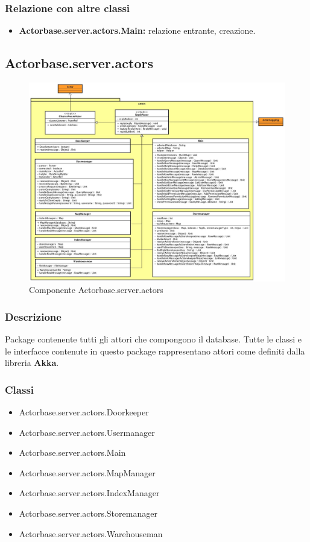 \documentclass[a4paper]{article}
\begin{document}
			\subsubsection{Relazione con altre classi}
				\begin{itemize}
					\item \textbf{Actorbase.server.actors.Main:} relazione entrante, creazione. 
				\end{itemize}

				
		\subsection{Actorbase.server.actors}
		
			\begin{figure} [H]
				\centering
				\includegraphics[width=\textwidth]{ST/Server/actorsLevel.jpg}
				\caption{Componente Actorbase.server.actors}
			\end{figure}
			
			\subsubsection{Descrizione}
				Package contenente tutti gli attori che compongono il database. Tutte le classi e le interfacce contenute in questo package rappresentano attori come definiti dalla libreria \textbf{Akka}.
				
			\subsubsection{Classi}
				\begin{itemize}
					\item Actorbase.server.actors.Doorkeeper
					\item Actorbase.server.actors.Usermanager
					\item Actorbase.server.actors.Main
					\item Actorbase.server.actors.MapManager
					\item Actorbase.server.actors.IndexManager
					\item Actorbase.server.actors.Storemanager
					\item Actorbase.server.actors.Warehouseman
				\end{itemize}
				
\end{document}
